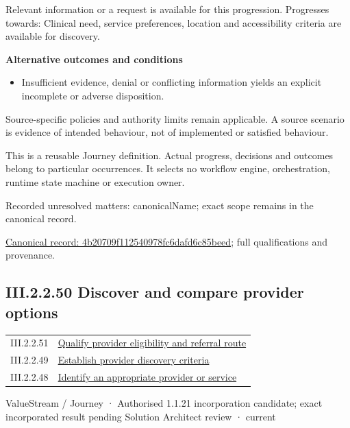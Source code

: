 Relevant information or a request is available for this progression. Progresses towards: Clinical need, service preferences, location and accessibility criteria are available for discovery.



\par\medskip\textbf{Alternative outcomes and conditions}\par


\begin{itemize}


\item Insufficient evidence, denial or conflicting information yields an explicit incomplete or adverse disposition.

\end{itemize}


Source-specific policies and authority limits remain applicable. A source scenario is evidence of intended behaviour, not of implemented or satisfied behaviour.



This is a reusable Journey definition. Actual progress, decisions and outcomes belong to particular occurrences. It selects no workflow engine, orchestration, runtime state machine or execution owner.


{\small Recorded unresolved matters: canonicalName; exact scope remains in the canonical record.}\par
{\footnotesize \href{../../../../continuum/strategy/value-stream/4b20709f112540978fc6dafd6c85beed.md}{Canonical record: 4b20709f112540978fc6dafd6c85beed}; full qualifications and provenance.}\par
\subsection*{III.2.2.50 Discover and compare provider options}
\label{navigation:III.2.2.50}

\begin{longtable}{p{.22\linewidth}p{.73\linewidth}}
III.2.2.51 & \hyperref[element:1406d16dbefa4752af95ca6041cd5712]{Qualify provider eligibility and referral route} \\
III.2.2.49 & \hyperref[element:4b20709f112540978fc6dafd6c85beed]{Establish provider discovery criteria} \\
III.2.2.48 & \hyperref[element:5d725d797f754857bf1b3d49d8f25044]{Identify an appropriate provider or service} \\
\end{longtable}
\label{element:13370b1e9a1349d8ba074e3ad5a8c1ae}
{\small ValueStream / Journey · Authorised 1.1.21 incorporation candidate; exact incorporated result pending Solution Architect review · current}\par

